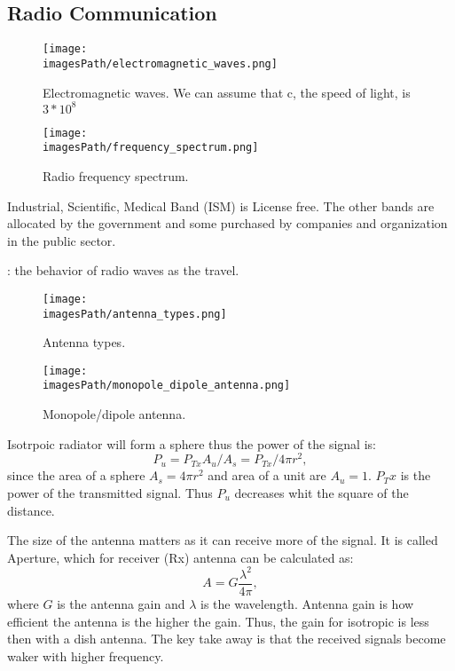 \subsection{Radio Communication}
\begin{figure}[H]
    \centering
    \texttt{[image: \\imagesPath/electromagnetic\_waves.png]}
    \caption{Electromagnetic waves. We can assume that c, the speed of light, is $3*10^8$}
\end{figure}

\begin{figure}[H]
    \centering
    \texttt{[image: \\imagesPath/frequency\_spectrum.png]}
    \caption{Radio frequency spectrum.}
\end{figure}

Industrial, Scientific, Medical Band (ISM) is License free. The other bands 
are allocated by the government and some purchased by companies and organization 
in the public sector.

: the behavior of radio waves as the travel.

\begin{figure}[H]
    \centering
    \texttt{[image: \\imagesPath/antenna\_types.png]}
    \caption{Antenna types.}
\end{figure}

\begin{figure}[H]
    \centering
    \texttt{[image: \\imagesPath/monopole\_dipole\_antenna.png]}
    \caption{Monopole/dipole antenna.}
\end{figure}

Isotrpoic radiator will form a sphere thus the power of the signal is:
\begin{equation}
    P_u = P_{Tx}A_u/A_s = P_{Tx}/4\pi r^2,
\end{equation}
since the area of a sphere $A_s=4\pi r^2$ and area of a unit are $A_u = 1$.
$P_Tx$ is the power of the transmitted signal. Thus $P_u$ decreases whit the square of the distance.

The size of the antenna matters as it can receive more of the signal.
It is called Aperture, which for receiver (Rx) antenna can be calculated as: 
\begin{equation}
    A = G\frac{\lambda^2}{4\pi},
\end{equation}
where $G$ is the antenna gain and $\lambda$ is the wavelength.
Antenna gain is how efficient the antenna is the higher the gain.
Thus, the gain for isotropic is less then with a dish antenna.
The key take away is that the received signals become waker with higher frequency.

